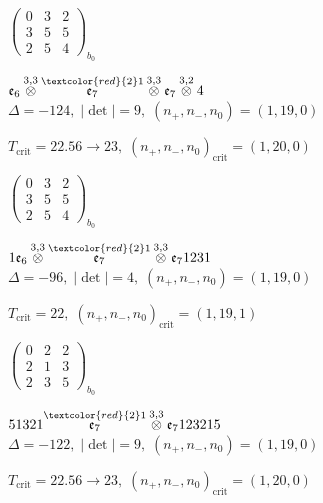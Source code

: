 \documentclass[10pt]{article}
\begin{document}
\hspace{2em}$\left(\begin{smallmatrix}0 & 3 & 2 \\ 3 & 5 & 5 \\ 2 & 5 & 4\end{smallmatrix}\right)_{\!b_0}$

\smallskip

$\mathfrak{e}_6\overset{3,3}{\otimes}\overset{\textcolor{red}{2}1}{\mathfrak{e}_7}\overset{3,3}{\otimes}\mathfrak{e}_7\overset{3,2}{\otimes}4$ \quad $\Delta=-124,\; |\det|=9,\; (n_+,n_-,n_0)=(1,19,0)$

\hspace{1em}$T_{\text{crit}}=22.56 \to 23,\; (n_+,n_-,n_0)_{\text{crit}}=(1,20,0)$

\hspace{2em}$\left(\begin{smallmatrix}0 & 3 & 2 \\ 3 & 5 & 5 \\ 2 & 5 & 4\end{smallmatrix}\right)_{\!b_0}$

\smallskip

$1\mathfrak{e}_6\overset{3,3}{\otimes}\overset{\textcolor{red}{2}1}{\mathfrak{e}_7}\overset{3,3}{\otimes}\mathfrak{e}_71231$ \quad $\Delta=-96,\; |\det|=4,\; (n_+,n_-,n_0)=(1,19,0)$

\hspace{1em}$T_{\text{crit}}=22,\; (n_+,n_-,n_0)_{\text{crit}}=(1,19,1)$

\hspace{2em}$\left(\begin{smallmatrix}0 & 2 & 2 \\ 2 & 1 & 3 \\ 2 & 3 & 5\end{smallmatrix}\right)_{\!b_0}$

\smallskip

$51321\overset{\textcolor{red}{2}1}{\mathfrak{e}_7}\overset{3,3}{\otimes}\mathfrak{e}_7123215$ \quad $\Delta=-122,\; |\det|=9,\; (n_+,n_-,n_0)=(1,19,0)$

\hspace{1em}$T_{\text{crit}}=22.56 \to 23,\; (n_+,n_-,n_0)_{\text{crit}}=(1,20,0)$
\end{document}
